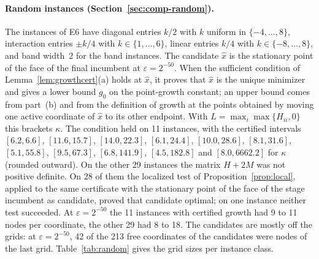 \paragraph{Random instances (Section~\ref{sec:comp-random}).}
The instances of E6 have diagonal entries $k/2$ with $k$ uniform in
$\{-4,\dots,8\}$, interaction entries $\pm k/4$ with $k\in\{1,\dots,6\}$,
linear entries $k/4$ with $k\in\{-8,\dots,8\}$, and band width~2 for the band
instances. The candidate $\hat x$ is the stationary point of the face of the
final incumbent at $\varepsilon=2^{-50}$. When the sufficient condition of
Lemma~\ref{lem:growthcert}(a) holds at $\hat x$, it proves that $\hat x$ is
the unique minimizer and gives a lower bound $g_0$ on the point-growth
constant; an upper bound comes from part~(b) and from the definition of growth
at the points obtained by moving one active coordinate of $\hat x$ to its
other endpoint. With $L=\max_i\max\{H_{ii},0\}$ this brackets $\kappa$. The
condition held on 11 instances, with the certified intervals $[6.2,6.6]$,
$[11.6,15.7]$, $[14.0,22.3]$, $[6.1,24.4]$, $[10.0,28.6]$, $[8.1,31.6]$,
$[5.1,55.8]$, $[9.5,67.3]$, $[6.8,141.9]$, $[4.5,182.8]$ and
$[8.0,6662.2]$ for $\kappa$ (rounded outward). On the other 29 instances the
matrix $H+2M$ was not positive definite. On 28 of them the localized test of
Proposition~\ref{prop:local}, applied to the same certificate with the
stationary point of the face of the stage incumbent as candidate, proved that
candidate optimal; on one instance neither test succeeded. At
$\varepsilon=2^{-50}$ the 11 instances with certified growth had 9 to 11
nodes per coordinate, the other 29 had 8 to 18. The candidates are mostly off
the grids: at $\varepsilon=2^{-50}$, 42 of the 213 free coordinates of the
candidates were nodes of the last grid. Table~\ref{tab:random} gives the grid
sizes per instance class.

